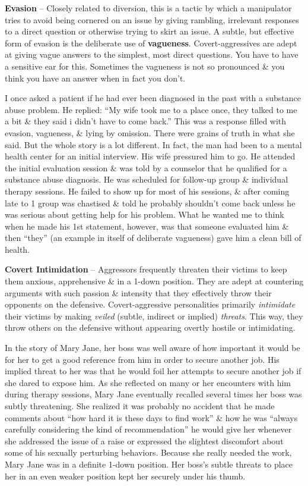 \documentclass{article}
\numberwithin{equation}{section}
\begin{document}
\textbf{Evasion} -- Closely related to diversion, this is a tactic by which a manipulator tries to avoid being cornered on an issue by giving rambling, irrelevant responses to a direct question or otherwise trying to skirt an issue. A subtle, but effective form of evasion is the deliberate use of \textbf{vagueness}. Covert-aggressives are adept at giving vague answers to the simplest, most direct questions. You have to have a sensitive ear for this. Sometimes the vagueness is not so pronounced \& you think you have an answer when in fact you don't.

I once asked a patient if he had ever been diagnosed in the past with a substance abuse problem. He replied: ``My wife took me to a place once, they talked to me a bit \& they said i didn't have to come back.'' This was a response filled with evasion, vagueness, \& lying by omission. There were grains of truth in what she said. But the whole story is a lot different. In fact, the man had been to a mental health center for an initial interview. His wife pressured him to go. He attended the initial evaluation session \& was told by a counselor that he qualified for a substance abuse diagnosis. He was scheduled for follow-up group \& individual therapy sessions. He failed to show up for most of his sessions, \& after coming late to 1 group was chastised \& told he probably shouldn't come back unless he was serious about getting help for his problem. What he wanted me to think when he made his 1st statement, however, was that someone evaluated him \& then ``they'' (an example in itself of deliberate vagueness) gave him a clean bill of health.

\textbf{Covert Intimidation} -- Aggressors frequently threaten their victims to keep them anxious, apprehensive \& in a 1-down position. They are adept at countering arguments with such passion \& intensity that they effectively throw their opponents on the defensive. Covert-aggressive personalities primarily \textit{intimidate} their victims by making \textit{veiled} (subtle, indirect or implied) \textit{threats}. This way, they throw others on the defensive without appearing overtly hostile or intimidating.

In the story of Mary Jane, her boss was well aware of how important it would be for her to get a good reference from him in order to secure another job. His implied threat to her was that he would foil her attempts to secure another job if she dared to expose him. As she reflected on many or her encounters with him during therapy sessions, Mary Jane eventually recalled several times her boss was subtly threatening. She realized it was probably no accident that he made comments about ``how hard it is these days to find work'' \& how he was ``always carefully considering the kind of recommendation'' he would give her whenever she addressed the issue of a raise or expressed the slightest discomfort about some of his sexually perturbing behaviors. Because she really needed the work, Mary Jane was in a definite 1-down position. Her boss's subtle threats to place her in an even weaker position kept her securely under his thumb.
\end{document}
